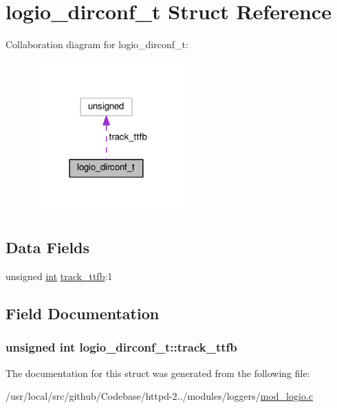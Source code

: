 \hypertarget{structlogio__dirconf__t}{}\section{logio\+\_\+dirconf\+\_\+t Struct Reference}
\label{structlogio__dirconf__t}


Collaboration diagram for logio\+\_\+dirconf\+\_\+t\+:
\nopagebreak
\begin{figure}[H]
\begin{center}
\leavevmode
\includegraphics[width=165pt]{structlogio__dirconf__t__coll__graph}
\end{center}
\end{figure}
\subsection*{Data Fields}
\begin{DoxyCompactItemize}
\item 
unsigned \hyperlink{pcre_8txt_a42dfa4ff673c82d8efe7144098fbc198}{int} \hyperlink{structlogio__dirconf__t_a5cbe2910effe7ffe0b073baddee80153}{track\+\_\+ttfb}\+:1
\end{DoxyCompactItemize}


\subsection{Field Documentation}
\subsubsection[{\texorpdfstring{track\+\_\+ttfb}{track_ttfb}}]{\setlength{\rightskip}{0pt plus 5cm}unsigned {\bf int} logio\+\_\+dirconf\+\_\+t\+::track\+\_\+ttfb}\hypertarget{structlogio__dirconf__t_a5cbe2910effe7ffe0b073baddee80153}{}\label{structlogio__dirconf__t_a5cbe2910effe7ffe0b073baddee80153}


The documentation for this struct was generated from the following file\+:\begin{DoxyCompactItemize}
\item 
/usr/local/src/github/\+Codebase/httpd-\/2../modules/loggers/\hyperlink{mod__logio_8c}{mod\+\_\+logio.\+c}\end{DoxyCompactItemize}
